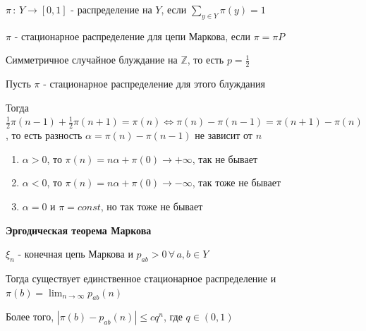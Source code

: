 \begin{definition}
    $\pi \, : \, Y \to [0, 1]$ - распределение на $Y$, если $\sum\limits_{y \in Y} \pi (y) = 1$
\end{definition}

\begin{definition}
    $\pi$ - стационарное распределение для цепи Маркова, если $\pi = \pi P$
\end{definition}

\begin{example}
    Симметричное случайное блуждание на $\mathbb{Z}$, то есть $p = \frac{1}{2}$

    Пусть $\pi$ - стационарное распределение для этого блуждания

    Тогда $\frac{1}{2} \pi (n - 1) + \frac{1}{2} \pi (n + 1) = \pi (n) \Longleftrightarrow \pi (n) - \pi (n - 1) = \pi (n + 1) - \pi (n)$, то есть разность $\alpha = \pi (n) - \pi (n - 1)$ не зависит от $n$

    \begin{enumerate}
        \item $\alpha > 0$, то $\pi (n) = n\alpha + \pi (0) \rightarrow +\infty$, так не бывает
        \item $\alpha < 0$, то $\pi (n) = n\alpha + \pi (0) \rightarrow -\infty$, так тоже не бывает
        \item $\alpha = 0$ и $\pi = const$, но так тоже не бывает 
    \end{enumerate}
\end{example}

\begin{theorem}
    \textbf{Эргодическая теорема Маркова}

    $\xi_n$ - конечная цепь Маркова и $p_{ab} > 0 \, \forall \, a, b \in Y$

    Тогда существует единственное стационарное распределение и $\pi (b) = \lim_{n \to \infty} p_{ab} (n)$

    Более того, $|\pi (b) - p_{ab} (n) | \leqslant cq^n $, где $q \in (0, 1)$
\end{theorem}

